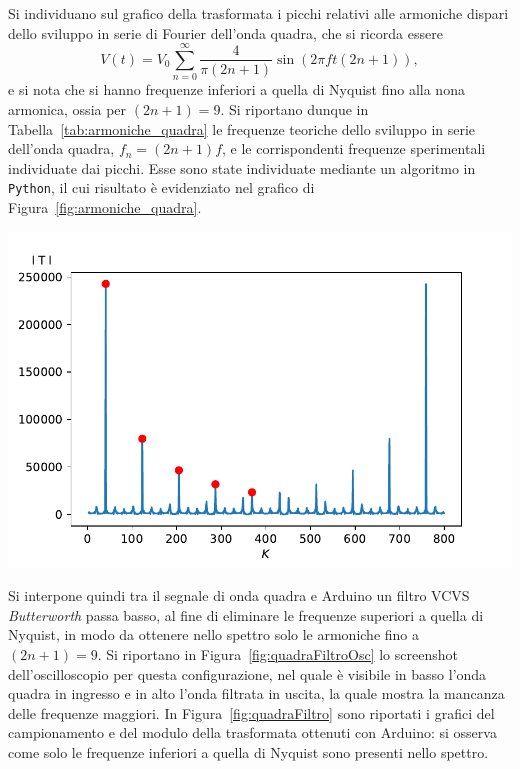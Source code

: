 \documentclass[10pt,oneside,a4paper]{article}
\newenvironment{Figure}
  {\par\medskip\noindent\minipage{\linewidth}}
  {\endminipage\par\medskip}
\begin{document}
\begin{multicols}{2}
Si individuano sul grafico della trasformata i picchi relativi alle armoniche dispari dello sviluppo in serie di Fourier dell'onda quadra, che si ricorda essere
\[
V(t) = V_0 \sum_{n=0}^{\infty} \frac{4}{\pi(2n+1)} \sin(2\pi f t(2n+1)), 
\]
e si nota che si hanno frequenze inferiori a quella di Nyquist fino alla nona armonica, ossia per $(2n+1) = 9$. Si riportano dunque in Tabella~\ref{tab:armoniche_quadra} le frequenze teoriche dello sviluppo in serie dell'onda quadra, $f_n = (2n+1)f$, e le corrispondenti frequenze sperimentali individuate dai picchi. Esse sono state individuate mediante un algoritmo in \texttt{Python}, il cui risultato è evidenziato nel grafico di Figura~\ref{fig:armoniche_quadra}.

\begin{Figure}
	\begin{center}
	\includegraphics[width=\linewidth]{rumore_analisi}
	\label{fig:armoniche_quadra}
	\end{center}
\end{Figure}


Si interpone quindi tra il segnale di onda quadra e Arduino un filtro VCVS \emph{Butterworth} passa basso, al fine di eliminare le frequenze superiori a quella di Nyquist, in modo da ottenere nello spettro solo le armoniche fino a $(2n+1)=9$. Si riportano in Figura~\ref{fig:quadraFiltroOsc} lo screenshot dell'oscilloscopio per questa configurazione, nel quale è visibile in basso l'onda quadra in ingresso e in alto l'onda filtrata in uscita, la quale mostra la mancanza delle frequenze maggiori. In Figura~\ref{fig:quadraFiltro} sono riportati i grafici del campionamento e del modulo della trasformata ottenuti con Arduino: si osserva come solo le frequenze inferiori a quella di Nyquist sono presenti nello spettro.


\end{multicols}
\end{document}
